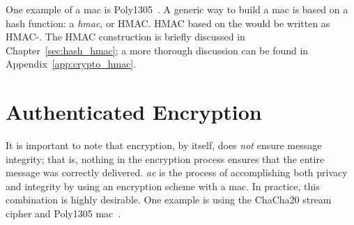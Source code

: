 One example of a \gls{mac} is Poly1305~\cite{poly1305}.
A generic way to build a \gls{mac} is based on a \gls{hash function}:
a \emph{\gls{hmac}}, or HMAC.
HMAC based on the \ShaTwo{} 
would be written as HMAC-\ShaTwo{}.
The HMAC construction is briefly discussed in Chapter~\ref{sec:hash_hmac};
a more thorough discussion can be found in Appendix~\ref{app:crypto_hmac}.



\section{Authenticated Encryption}
\label{sec:symmetric_ae}

It is important to note that encryption, by itself,
does \emph{not} ensure message integrity;
that is, nothing in the encryption process ensures that
the entire message was correctly delivered.
\emph{\Gls{ae}} is the process of
accomplishing both privacy and integrity
by using an \gls{encryption scheme} with a \gls{mac}.
In practice, this combination is highly desirable.
One example is using the ChaCha20 \gls{stream cipher} and
Poly1305 \gls{mac}~\cite{rfc8439,cryptoeprint:2014:613}.

